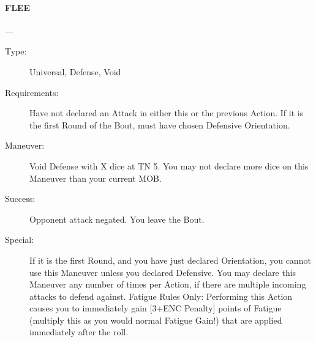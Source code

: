 \documentclass[oneside,11pt,english]{book}
\begin{document}
\paragraph{\large\label{man:FLEE} FLEE}---
\vspace{-10pt}\begin{description} 
\item [Type:] Universal, Defense, Void 
\item [Requirements:] Have not declared an Attack in either this or the previous Action. If it is the first Round 
of the Bout, must have chosen Defensive Orientation. 
\item [Maneuver:] Void Defense with X dice at TN 5. You may not declare more dice on this Maneuver than 
your current MOB. 
\item [Success:] Opponent attack negated. You leave the Bout. 
\item [Special:] If it is the first Round, and you have just declared Orientation, you cannot use this Maneuver 
unless you declared Defensive. 
You may declare this Maneuver any number of times per Action, if there are multiple incoming attacks to 
defend against. 
Fatigue Rules Only: Performing this Action causes you to immediately gain [3+ENC Penalty] points of 
Fatigue (multiply this as you would normal Fatigue Gain!) that are applied immediately after the roll. 
\end{description}
\end{document}
